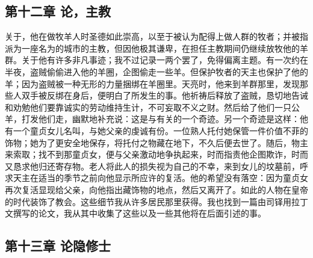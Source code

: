 
\subsection{第十二章 论，主教}

关于，他在做牧羊人时圣德如此崇高，以至于被认为配得上做人群的牧者；并被指派为一座名为的城市的主教，但因他极其谦卑，在担任主教期间仍继续放牧他的羊群。关于他有许多非凡事迹；我不过记录一两个罢了，免得偏离主题。有一次约在半夜，盗贼偷偷进入他的羊圈，企图偷走一些羊。但保护牧者的天主也保护了他的羊；因为盗贼被一种无形的力量捆绑在羊圈里。天亮时，他来到羊群那里，发现那些人双手被反绑在身后，便明白了所发生的事。他祈祷后释放了盗贼，恳切地告诫和劝勉他们要靠诚实的劳动维持生计，不可妄取不义之财。然后给了他们一只公羊，打发他们走，幽默地补充说：这是与有关的一个奇迹。另一个奇迹是这样：他有一个童贞女儿名叫，与她父亲的虔诚有份。一位熟人托付她保管一件价值不菲的饰物；她为了更安全地保存，将托付之物藏在地下，不久后便去世了。随后，物主来索取；找不到那童贞女，便与父亲激动地争执起来，时而指责他企图欺诈，时而又恳求他归还寄存物。老人将此人的损失视为自己的不幸，来到女儿的坟墓前，呼求天主在适当的季节之前向他显示所应许的复活。他的希望没有落空：因为童贞女再次复活显现给父亲，向他指出藏饰物的地点，然后又离开了。如此的人物在皇帝的时代装饰了教会。这些细节我从许多居民那里获得。我也找到一篇由司铎用拉丁文撰写的论文，我从其中收集了这些以及一些其他将在后面引述的事。\par


\subsection{第十三章 论隐修士}

